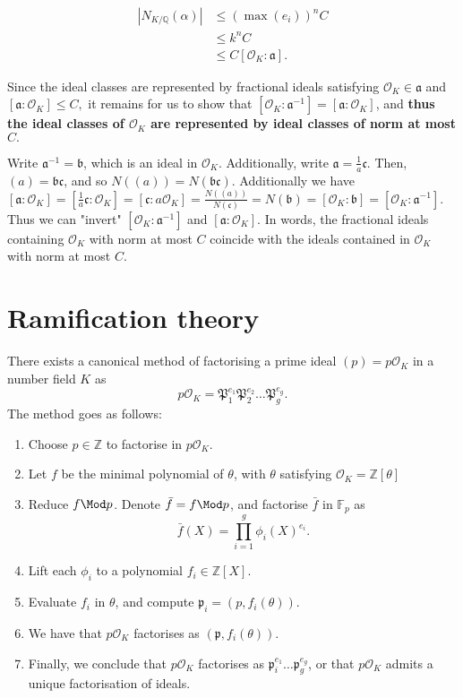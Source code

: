 \documentclass[a4paper, 12pt,oneside,openany]{book}
\begin{document}
\begin{align*}
    |N_{K/\mathbb{Q}}(\alpha)| &\leq (\max(e_i))^n C \\
    &\leq k^nC \\
    &\leq C[\mathcal{O}_K:\mathfrak{a}].
\end{align*}

Since the ideal classes are represented by fractional ideals satisfying $\mathcal{O}_K \in \mathfrak{a}$ and $[\mathfrak{a}:\mathcal{O}_K] \leq C,$ it remains for us to show that $[\mathcal{O}_K:\mathfrak{a}^{-1}]=[\mathfrak{a}:\mathcal{O}_K]$, and \textbf{thus the ideal classes of $\mathcal{O}_K$ are represented by ideal classes of norm at most $C.$}

Write $\mathfrak{a}^{-1}=\mathfrak{b}$, which is an ideal in $\mathcal{O}_K.$ Additionally, write $\mathfrak{a}=\frac{1}{a}\mathfrak{c}.$ Then, $(a)=\mathfrak{bc}$, and so $N((a))=N(\mathfrak{bc}).$ Additionally we have $[\mathfrak{a}:\mathcal{O}_K]=[\frac{1}{a}\mathfrak{c}:\mathcal{O}_K]=[\mathfrak{c}:a\mathcal{O}_K]=\frac{N((a))}{N(\mathfrak{c})}=N(\mathfrak{b}) = [\mathcal{O}_K: \mathfrak{b}] = [\mathcal{O}_K:\mathfrak{a}^{-1}].$ Thus we can "invert" $[\mathcal{O}_K:\mathfrak{a}^{-1}]$ and $[\mathfrak{a}:\mathcal{O}_K]$. In words, the fractional ideals containing $\mathcal{O}_K$ with norm at most $C$ coincide with the ideals contained in $\mathcal{O}_K$ with norm at most $C.$ \label{inversion}
 
\section{Ramification theory}

There exists a canonical method of factorising a prime ideal $(p) = p\mathcal{O}_K$ in a number field $K$ as $$p\mathcal{O}_K=\mathfrak{P}_1^{e_1}\mathfrak{P}_2^{e_2}\dots\mathfrak{P}_g^{e_g}.$$ The method goes as follows:

\begin{enumerate}
    \item Choose $p \in \mathbb{Z}$ to factorise in $p\mathcal{O}_K.$
    \item Let $f$ be the minimal polynomial of $\theta$, with $\theta$ satisfying $\mathcal{O}_K = \mathbb{Z}[\theta]$
    \item Reduce $f \Mod p$. Denote $\bar{f} = f \Mod p$, and factorise $\bar{f}$ in $\mathbb{F}_p$ as $$\bar{f}(X) = \prod\limits_{i=1}^g \phi_i(X)^{e_i}.$$
    \item Lift each $\phi_i$ to a polynomial $f_i \in \mathbb{Z}[X].$
    \item Evaluate $f_i$ in $\theta$, and compute $\mathfrak{p}_i=(p, f_i(\theta)).$
    \item We have that $p\mathcal{O}_K$ factorises as $(\mathfrak{p}, f_i(\theta)).$
    \item Finally, we conclude that $p\mathcal{O}_K$ factorises as $\mathfrak{p}_i^{e_1}\dots \mathfrak{p}_g^{e_g}$, or that $p\mathcal{O}_K$ admits a unique factorisation of ideals.
\end{enumerate}
\end{document}
